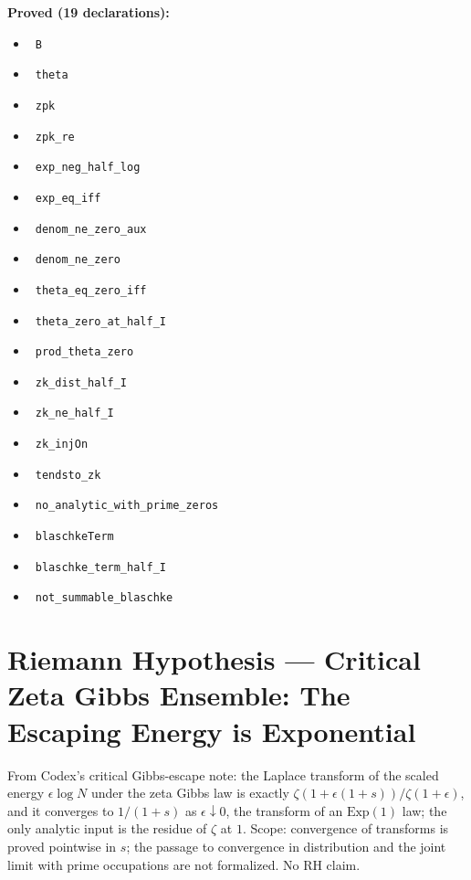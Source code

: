 \documentclass{report}
\theoremstyle{definition}
\begin{document}
\noindent\textbf{Proved (19 declarations):}
\begin{itemize}
  \item {}\leanok\ \texttt{B}
  \item {}\leanok\ \texttt{theta}
  \item {}\leanok\ \texttt{zpk}
  \item {}\leanok\ \texttt{zpk\_re}
  \item {}\leanok\ \texttt{exp\_neg\_half\_log}
  \item {}\leanok\ \texttt{exp\_eq\_iff}
  \item {}\leanok\ \texttt{denom\_ne\_zero\_aux}
  \item {}\leanok\ \texttt{denom\_ne\_zero}
  \item {}\leanok\ \texttt{theta\_eq\_zero\_iff}
  \item {}\leanok\ \texttt{theta\_zero\_at\_half\_I}
  \item {}\leanok\ \texttt{prod\_theta\_zero}
  \item {}\leanok\ \texttt{zk\_dist\_half\_I}
  \item {}\leanok\ \texttt{zk\_ne\_half\_I}
  \item {}\leanok\ \texttt{zk\_injOn}
  \item {}\leanok\ \texttt{tendsto\_zk}
  \item {}\leanok\ \texttt{no\_analytic\_with\_prime\_zeros}
  \item {}\leanok\ \texttt{blaschkeTerm}
  \item {}\leanok\ \texttt{blaschke\_term\_half\_I}
  \item {}\leanok\ \texttt{not\_summable\_blaschke}
\end{itemize}

\section{Riemann Hypothesis --- Critical Zeta Gibbs Ensemble: The Escaping Energy is Exponential}
From Codex's critical Gibbs-escape note: the Laplace transform of the scaled energy $\epsilon\log N$ under the zeta Gibbs law is exactly $\zeta(1+\epsilon(1+s))/\zeta(1+\epsilon)$, and it converges to $1/(1+s)$ as $\epsilon\downarrow0$, the transform of an $\mathrm{Exp}(1)$ law; the only analytic input is the residue of $\zeta$ at $1$. Scope: convergence of transforms is proved pointwise in $s$; the passage to convergence in distribution and the joint limit with prime occupations are not formalized. No RH claim.
\end{document}
